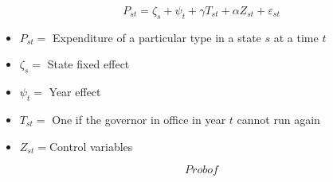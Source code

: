 \documentclass{article}
\begin{document}
	\[
	P_{st} = \zeta_{s} + \psi_{t} + \gamma T_{st} + \alpha Z_{st} + \varepsilon_{st}
	\]
	
	\begin{itemize}
		\item $P_{st} = $ Expenditure of a particular type in a state $s$ at a time $t$
		\item $\zeta_{s} = $ State fixed effect
		\item $\psi_{t} = $ Year effect
		\item $T_{st} = $ One if the governor in office in year $t$ cannot run again
		\item $Z_{st} = $Control variables  
	\end{itemize}
	
	\[
	Prob of
	\]
\end{document}

